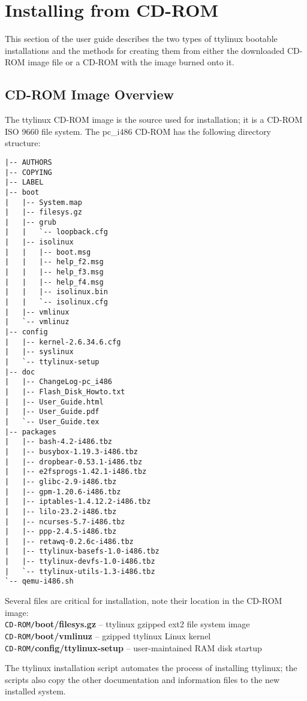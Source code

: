 \documentclass[10pt]{article}
\begin{document}
\newpage
\section{Installing from CD-ROM}
\label{installation}

This section of the user guide describes the two types of ttylinux bootable
installations and the methods for creating them from either the downloaded
CD-ROM image file or a CD-ROM with the image burned onto it.

\subsection{CD-ROM Image Overview}

The ttylinux CD-ROM image is the source used for installation; it is a CD-ROM
ISO 9660 file system. The pc\_i486 CD-ROM has the following directory structure:

\begin{lstlisting}
|-- AUTHORS
|-- COPYING
|-- LABEL
|-- boot
|   |-- System.map
|   |-- filesys.gz
|   |-- grub
|   |   `-- loopback.cfg
|   |-- isolinux
|   |   |-- boot.msg
|   |   |-- help_f2.msg
|   |   |-- help_f3.msg
|   |   |-- help_f4.msg
|   |   |-- isolinux.bin
|   |   `-- isolinux.cfg
|   |-- vmlinux
|   `-- vmlinuz
|-- config
|   |-- kernel-2.6.34.6.cfg
|   |-- syslinux
|   `-- ttylinux-setup
|-- doc
|   |-- ChangeLog-pc_i486
|   |-- Flash_Disk_Howto.txt
|   |-- User_Guide.html
|   |-- User_Guide.pdf
|   `-- User_Guide.tex
|-- packages
|   |-- bash-4.2-i486.tbz
|   |-- busybox-1.19.3-i486.tbz
|   |-- dropbear-0.53.1-i486.tbz
|   |-- e2fsprogs-1.42.1-i486.tbz
|   |-- glibc-2.9-i486.tbz
|   |-- gpm-1.20.6-i486.tbz
|   |-- iptables-1.4.12.2-i486.tbz
|   |-- lilo-23.2-i486.tbz
|   |-- ncurses-5.7-i486.tbz
|   |-- ppp-2.4.5-i486.tbz
|   |-- retawq-0.2.6c-i486.tbz
|   |-- ttylinux-basefs-1.0-i486.tbz
|   |-- ttylinux-devfs-1.0-i486.tbz
|   `-- ttylinux-utils-1.3-i486.tbz
`-- qemu-i486.sh
\end{lstlisting}

Several files are critical for installation, note their location in the CD-ROM
image:\\
{\tt CD-ROM/}{\bf boot/filesys.gz} -- ttylinux gzipped ext2 file system image\\
{\tt CD-ROM/}{\bf boot/vmlinuz} -- gzipped ttylinux Linux kernel\\
{\tt CD-ROM/}{\bf config/ttylinux-setup} -- user-maintained RAM disk startup

The ttylinux installation script automates the process of installing ttylinux;
the scripts also copy the other documentation and information files to the new
installed system.
\end{document}
